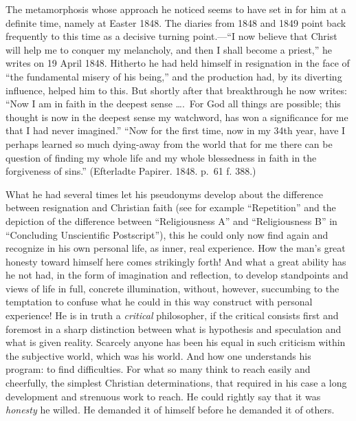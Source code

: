 \documentclass[12pt,a4paper]{book}
\newcommand{\opage}[1]{\marginnote{\footnotesize\textit{[#1]}}}
\begin{document}
The metamorphosis whose approach he noticed seems to have set in for him
at a definite time, namely at Easter 1848. The diaries from 1848 and
1849 point back frequently to this time as a decisive turning
point.---``I now believe that Christ will help me to conquer my
melancholy, and then I shall become a priest,'' he writes on 19 April
1848. Hitherto he had held himself in resignation in the face of ``the
fundamental misery of his being,'' and the production had, by its
diverting influence, helped him to this. But shortly after that
breakthrough he now writes: ``Now I am in faith in the deepest sense
\dots.\ For God all things are possible; this thought is now in the
deepest sense my watchword, has won a significance for me that I had
never imagined.'' ``Now
\opage{129}for the first time, now in my 34th year, have I perhaps
learned so much dying-away from the world that for me there can be
question of finding my whole life and my whole blessedness in faith in
the forgiveness of sins.'' (Efterladte Papirer. 1848. p.~61 f. 388.)

What he had several times let his pseudonyms develop about the
difference between resignation and Christian faith (see for example
``Repetition'' and the depiction of the difference between
``Religiousness A'' and ``Religiousness B'' in ``Concluding Unscientific
Postscript''), this he could only now find again and recognize in his
own personal life, as inner, real experience. How the man's great
honesty toward himself here comes strikingly forth! And what a great
ability has he not had, in the form of imagination and reflection, to
develop standpoints and views of life in full, concrete illumination,
without, however, succumbing to the temptation to confuse what he could
in this way construct with personal experience! He is in truth a
\textit{critical} philosopher, if the critical consists first and
foremost in a sharp distinction between what is hypothesis and
speculation and what is given reality. Scarcely anyone has been his
equal in such criticism within the subjective world, which was his
world. And how one understands his program: to find difficulties. For
what so many think to reach easily and cheerfully, the simplest
Christian determinations, that required in his case a long development
and strenuous work to reach. He could rightly say that it was
\textit{honesty} he willed. He demanded it of himself before he
demanded it of others.
\end{document}
